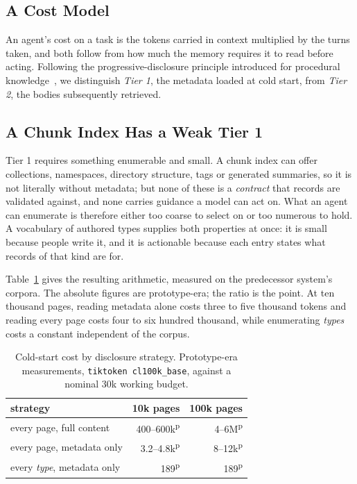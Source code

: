 \documentclass[journal,nofonttune]{IEEEtran}
\newcommand{\pn}[1]{#1\textsuperscript{\textsf{p}}}
\begin{document}
\subsection{A Cost Model}
An agent's cost on a task is the tokens carried in context multiplied by the
turns taken, and both follow from how much the memory requires it to read
before acting. Following the progressive-disclosure principle introduced for
procedural knowledge~\cite{agentskills}, we distinguish \emph{Tier 1}, the
metadata loaded at cold start, from \emph{Tier 2}, the bodies subsequently
retrieved.

\subsection{A Chunk Index Has a Weak Tier 1}
Tier 1 requires something enumerable and small. A chunk index can offer
collections, namespaces, directory structure, tags or generated summaries, so
it is not literally without metadata; but none of these is a \emph{contract}
that records are validated against, and none carries guidance a model can act
on. What an agent can enumerate is therefore either too coarse to select on
or too numerous to hold. A vocabulary of authored types supplies both
properties at once: it is small because people write it, and it is
actionable because each entry states what records of that kind are for.

Table~\ref{tab:costmodel} gives the resulting arithmetic, measured on the
predecessor system's corpora. The absolute figures are prototype-era; the
ratio is the point. At ten thousand pages, reading metadata alone costs three
to five thousand tokens and reading every page costs four to six hundred
thousand, while enumerating \emph{types} costs a constant independent of the
corpus.

\begin{table}[!t]
\caption{Cold-start cost by disclosure strategy. Prototype-era measurements,
\texttt{tiktoken cl100k\_base}, against a nominal 30k working budget.}
\label{tab:costmodel}
\centering
\begin{tabular}{lrr}
\toprule
strategy & 10k pages & 100k pages \\
\midrule
every page, full content          & \pn{400--600k} & \pn{4--6M} \\
every page, metadata only         & \pn{3.2--4.8k} & \pn{8--12k} \\
every \emph{type}, metadata only  & \pn{189}       & \pn{189} \\
\bottomrule
\end{tabular}
\end{table}
\end{document}
